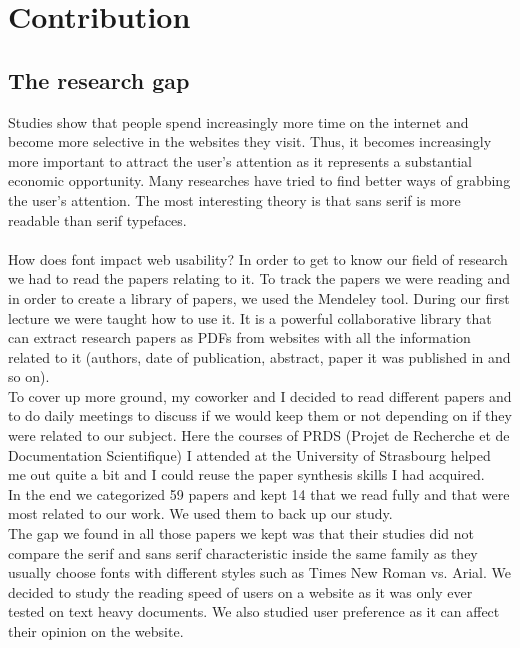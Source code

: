 \documentclass{article}
\begin{document}
\newpage
\section{Contribution}

\subsection{The research gap}
Studies show that people spend increasingly more time on the internet and become more selective in the websites they visit. Thus, it becomes increasingly more important to attract the user's attention as it represents a substantial economic opportunity.
Many researches have tried to find better ways of grabbing the user's attention. The most interesting theory is that sans serif is more readable than serif typefaces.
\\\\
How does font impact web usability?
In order to get to know our field of research we had to read the papers relating to it.
To track the papers we were reading and in order to create a library of papers, we used the Mendeley tool.
During our first lecture we were taught how to use it. It is a powerful collaborative library that can extract research papers as PDFs from websites with all the information related to it (authors, date of publication, abstract, paper it was published in and so on).
\\
To cover up more ground, my coworker and I decided to read different papers and to do daily meetings to discuss if we would keep them or not depending on if they were related to our subject.
Here the courses of PRDS (Projet de Recherche et de Documentation Scientifique) I attended at the University of Strasbourg helped me out quite a bit and I could reuse the paper synthesis skills I had acquired.
\\
In the end we categorized 59 papers and kept 14 that we read fully and that were most related to our work. We used them to back up our study.
\\
The gap we found in all those papers we kept was that their studies did not compare the serif and sans serif characteristic inside the same family as they usually choose fonts with different styles such as Times New Roman vs. Arial.
We decided to study the reading speed of users on a website as it was only ever tested on text heavy documents. We also studied user preference as it can affect their opinion on the website.
\end{document}

